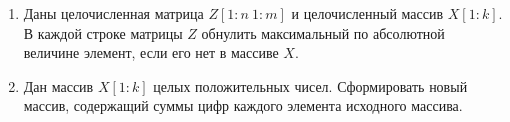 \begin{enumerate}
    \item Даны целочисленная матрица \(Z[1{:}n\ 1{:}m]\)  и целочисленный массив \(X[1{:}k]\). 
          В каждой строке матрицы \(Z\)  обнулить максимальный по абсолютной
          величине элемент, если его нет в массиве \(X\). 
    \item Дан массив \(X[1{:}k]\) целых положительных чисел. Сформировать новый массив, содержащий суммы цифр каждого элемента исходного массива.
\end{enumerate}